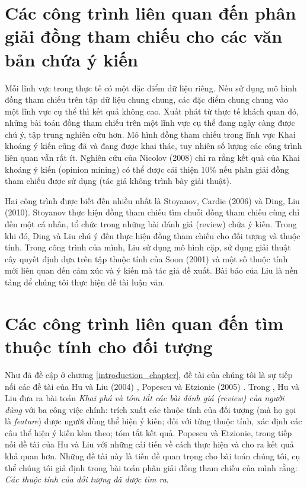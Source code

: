 \documentclass[12pt]{report}
\begin{document}
		\section{Các công trình liên quan đến phân giải đồng tham chiếu cho các văn bản chứa ý kiến}
			\par Mỗi lĩnh vực trong thực tế có một đặc điểm dữ liệu riêng. Nếu sử dụng mô hình đồng tham chiếu trên tập dữ liệu chung chung, các đặc điểm chung chung vào một lĩnh vực cụ thể thì kết quả không cao. Xuất phát từ thực tế khách quan đó, những bài toán đồng tham chiếu trên một lĩnh vực cụ thể đang ngày càng được chú ý, tập trung nghiên cứu hơn. Mô hình đồng tham chiếu trong lĩnh vực Khai khoáng ý kiến cũng đã và đang được khai thác, tuy nhiên số lượng các công trình liên quan vẫn rất ít. Nghiên cứu của Nicolov (2008)\cite{nicolov08} chỉ ra rằng kết quả của Khai khoáng ý kiến (opinion mining) có thể được cải thiện 10\% nếu phân giải đồng tham chiếu được sử dụng (tác giả không trình bày giải thuật). 
			\par Hai công trình được biết đến nhiều nhất là Stoyanov, Cardie (2006)\cite{stoyanov06} và Ding, Liu (2010)\cite{mainpaper}. Stoyanov thực hiện đồng tham chiếu tìm chuỗi đồng tham chiếu cùng chỉ đến một cá nhân, tổ chức trong những bài đánh giá (review) chứa ý kiến. Trong khi đó, Ding và Liu chú ý đến thực hiện đồng tham chiếu cho đối tượng và thuộc tính. Trong công trình của mình, Liu sử dụng mô hình cặp, sử dụng giải thuật cây quyết định dựa trên tập thuộc tính của Soon (2001)\cite{soon01} và một số thuộc tính mới liên quan đến cảm xúc và ý kiến mà tác giả đề xuất. Bài báo của Liu là nền tảng để chúng tôi thực hiện đề tài luận văn.

		\section{Các công trình liên quan đến tìm thuộc tính cho đối tượng}
			\par Như đã đề cập ở chương \ref{introduction_chapter}, đề tài của chúng tôi là sự tiếp nối các đề tài của Hu và Liu (2004) \cite{findfeatures1}, Popescu và Etzionie (2005) \cite{findfeatures2}. Trong \cite{findfeatures1}, Hu và Liu đưa ra bài toán \textit{Khai phá và tóm tắt các bài đánh giá (review) của người dùng} với ba công việc chính: trích xuất các thuộc tính của đối tượng (mà họ gọi là \textit{feature}) được người dùng thể hiện ý kiến; đối với từng thuộc tính, xác định các câu thể hiện ý kiến kèm theo; tóm tắt kết quả. Popescu và Etzionie, trong \cite{findfeatures2} tiếp nối đề tài của Hu và Liu với những cải tiến về cách thực hiện và cho ra kết quả khả quan hơn. Những đề tài này là tiền đề quan trọng cho bài toán chúng tôi, cụ thể chúng tôi giả định trong bài toán phân giải đồng tham chiếu của mình rằng: \textit{Các thuộc tính của đối tượng đã được tìm ra}.
\end{document}
